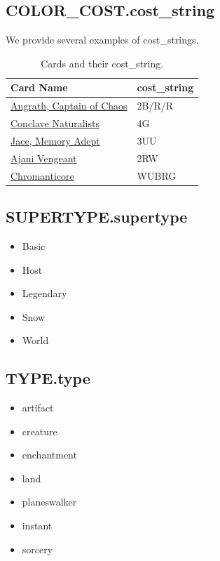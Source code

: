 \documentclass{article}
\begin{document}
\subsection{COLOR\_COST.cost\_string}
We provide several examples of cost\_strings.
\begin{table}[h!] %
    \centering
    \caption{Cards and their cost\_string.}
    \label{tab:coststring}
    \begin{tabular}{ll}
        Card Name & cost\_string \\
        \hline
        \href{https://scryfall.com/card/war/227/angrath-captain-of-chaos}{Angrath, Captain of Chaos} & 2B/R/R \\
        \href{https://scryfall.com/card/ori/171/conclave-naturalists}{Conclave Naturalists} & 4G \\
        \href{https://scryfall.com/card/m13/56/jace-memory-adept}{Jace, Memory Adept} & 3UU \\
        \href{https://scryfall.com/card/prm/31969/ajani-vengeant}{Ajani Vengeant} & 2RW \\
        \href{https://scryfall.com/card/bng/144/chromanticore}{Chromanticore} & WUBRG \\
    \end{tabular}
\end{table}

\subsection{SUPERTYPE.supertype}
\begin{multicols}{3}
    \begin{itemize}
        \item Basic
        \item Host
        \item Legendary
        \item Snow
        \item World
    \end{itemize}
\end{multicols}

\subsection{TYPE.type}
\begin{multicols}{3}
    \begin{itemize}
            \item artifact
            \item creature
            \item enchantment
            \item land
            \item planeswalker
            \item instant
            \item sorcery
    \end{itemize}
\end{multicols}
\end{document}
